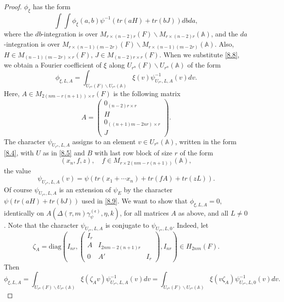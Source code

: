 \documentclass[12pts]{amsart}
\newcommand{\BA}{{\mathbb {A}}}
\newcommand{\diag}{{\mathrm{diag}}}
\begin{document}
\begin{proof}
	$\phi_\xi$ has the form
	\begin{equation}\label{8.9}
	\int\int\phi_\xi(a,b)\psi^{-1}(tr(aH)+tr(bJ))dbda,
	\end{equation}
	where the $db$-integration is over $M_{r\times (n-2)r}(F)\backslash M_{r\times (n-2)r}(\BA)$, and the $da$-integration is over $M_{r\times (n-1)(m-2r)}(F)\backslash M_{r\times (n-1)(m-2r)}(\BA)$. Also, $H\in M_{(n-1)(m-2r)\times r}(F)$, $J\in M_{(n-2)r\times r}(F)$.
	When we substitute \eqref{8.8}, we obtain a Fourier coefficient of
	$\xi$ along $U_{r^n}(F)\backslash U_{r^n}(\BA)$ of the form
	\begin{equation}\label{8.10}
	\phi_{\xi,L,A}=\int_{U_{r^n}(F)\backslash U_{r^n}(\BA)}\xi(v)\psi_{U_{r^n},L,A}^{-1}(v)dv.
	\end{equation}
	Here, $A\in M_{2(nm-r(n+1))\times r}(F)$ is the following
	matrix
	$$
	A=\begin{pmatrix}0_{(n-2)r\times r}\\H\\0_{((n+1)m-2nr)\times
		r}\\J\end{pmatrix}.
	$$
	The character $\psi_{U_{r^n},L,A}$ assigns to an element $v\in
	U_{r^n}(\BA)$, written in the form \eqref{8.4}, with $U$ as in
	\eqref{8.5} and $B$ with last row block of size $r$ of the form
	\begin{equation}\label{8.11}
	(x_n,f,z),\quad f\in M_{r\times 2(nm-r(n+1))}(\BA),
	\end{equation}
	the value
	\begin{equation}\label{8.12}
	\psi_{U_{r^n},L,A}(v)=\psi(tr(x_1+\cdots x_n)+tr(fA)+tr(zL)).
	\end{equation}
	Of course $\psi_{U_{r^n},L,A}$ is an extension of $\psi_E$ by the
	character $\psi(tr(aH)+tr(bJ))$ used in \eqref{8.9}. We want to show
	that $\phi_{\xi,L,A}=0$, identically on $A(\Delta(\tau,m)\gamma_\psi^{(\epsilon)},\eta,k)$, for all matrices $A$
	as above, and all $L\neq 0$. Note that the character
	$\psi_{U_{r^n},L,A}$ is conjugate to $\psi_{U_{r^n},L,0}$. Indeed,
	let
	$$
	\zeta_A=\diag (I_{nr},\begin{pmatrix}
	I_r\\A&I_{2nm-2(n+1)r}\\0&A'&I_r\end{pmatrix},I_{nr})\in
	H_{2nm}(F).
	$$
	Then
	$$
	\phi_{\xi,L,A}=\int_{U_{r^n}(F)\backslash U_{r^n}(\BA)}\xi(\zeta_A
	v)\psi_{U_{r^n},L,A}^{-1}(v)dv=\int_{U_{r^n}(F)\backslash
		U_{r^n}(\BA)}\xi(v\zeta_A)\psi_{U_{r^n},L,0}^{-1}(v)dv.
$$
\end{proof}
\end{document}

